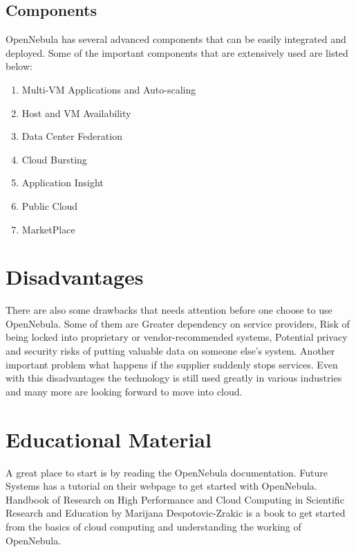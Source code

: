 \documentclass[9pt,twocolumn,twoside]{styles/osajnl}
\begin{document}
\subsection{Components}

OpenNebula has several {advanced components}\cite{www-components} 
that can be easily 
integrated and deployed. Some of the important components that are 
extensively used are listed below:

\begin{enumerate}
	
	\item Multi-VM Applications and Auto-scaling
	\item Host and VM Availability
	\item Data Center Federation
	\item Cloud Bursting
	\item Application Insight
	\item Public Cloud
	\item MarketPlace
	
\end{enumerate}

\section{Disadvantages}

There are also some drawbacks that needs attention before one choose to 
use OpenNebula. Some of them are Greater dependency on service providers, 
Risk of being locked into proprietary or vendor-recommended systems, 
Potential privacy and security risks of putting valuable data on someone else's system. 
Another important problem what happens if the supplier suddenly stops 
services. Even with this disadvantages the technology is still used 
greatly in various industries and many more are looking forward to 
move into cloud.

\section{Educational Material}

A great place to start is by reading the {OpenNebula 
documentation}\cite{www-opennebula-documentation}. 
{Future Systems has a tutorial on their 
webpage}\cite{www-opennebula-tutorial} to get started with 
OpenNebula. {Handbook of Research on High Performance and Cloud 
Computing in Scientific Research and Education}\cite{book-hpc} by 
Marijana Despotovic-Zrakic is a book to get started from the 
basics of cloud computing and understanding the working of OpenNebula.
\end{document}
